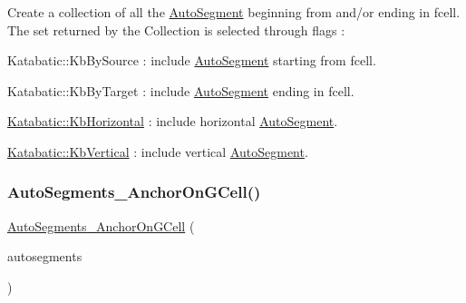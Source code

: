 Create a collection of all the \mbox{\hyperlink{classKatabatic_1_1AutoSegment}{Auto\+Segment}} beginning from and/or ending in {\ttfamily fcell}. The set returned by the Collection is selected through {\ttfamily flags} \+:
\begin{DoxyItemize}
\item Katabatic\+::\+Kb\+By\+Source \+: include \mbox{\hyperlink{classKatabatic_1_1AutoSegment}{Auto\+Segment}} starting from {\ttfamily fcell}.
\item Katabatic\+::\+Kb\+By\+Target \+: include \mbox{\hyperlink{classKatabatic_1_1AutoSegment}{Auto\+Segment}} ending in {\ttfamily fcell}.
\item \mbox{\hyperlink{namespaceKatabatic_a2af2ad6b6441614038caf59d04b3b217a1a9045673c5d3c30b067100f1440ae1b}{Katabatic\+::\+Kb\+Horizontal}} \+: include horizontal \mbox{\hyperlink{classKatabatic_1_1AutoSegment}{Auto\+Segment}}.
\item \mbox{\hyperlink{namespaceKatabatic_a2af2ad6b6441614038caf59d04b3b217a284cad95203a27172838b09e396e3590}{Katabatic\+::\+Kb\+Vertical}} \+: include vertical \mbox{\hyperlink{classKatabatic_1_1AutoSegment}{Auto\+Segment}}. 
\end{DoxyItemize}\mbox{\label{classKatabatic_1_1AutoSegments__AnchorOnGCell_a4597cd793ef7f6a5be546b24863f99e8}} 
\subsubsection{\texorpdfstring{Auto\+Segments\+\_\+\+Anchor\+On\+G\+Cell()}{AutoSegments\_AnchorOnGCell()}\hspace{0.1cm}{\footnotesize\ttfamily [2/2]}}
{\footnotesize\ttfamily \mbox{\hyperlink{classKatabatic_1_1AutoSegments__AnchorOnGCell}{Auto\+Segments\+\_\+\+Anchor\+On\+G\+Cell}} (\begin{DoxyParamCaption}\item[{const \mbox{\hyperlink{classKatabatic_1_1AutoSegments__AnchorOnGCell}{Auto\+Segments\+\_\+\+Anchor\+On\+G\+Cell}} \&}]{autosegments }\end{DoxyParamCaption})\hspace{0.3cm}{\ttfamily [inline]}}

